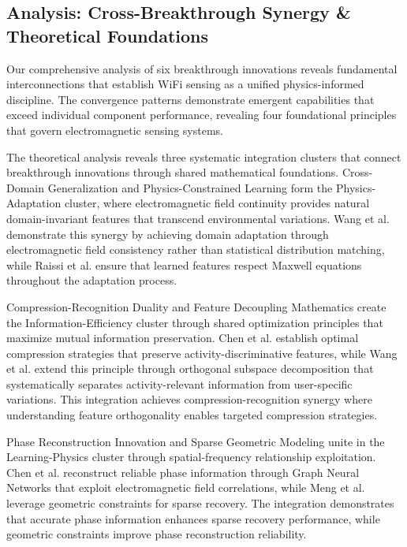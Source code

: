 \documentclass[journal]{IEEEtran}
\begin{document}
\subsection{Analysis: Cross-Breakthrough Synergy \& Theoretical Foundations}

Our comprehensive analysis of six breakthrough innovations reveals fundamental interconnections that establish WiFi sensing as a unified physics-informed discipline. The convergence patterns demonstrate emergent capabilities that exceed individual component performance, revealing four foundational principles that govern electromagnetic sensing systems.

The theoretical analysis reveals three systematic integration clusters that connect breakthrough innovations through shared mathematical foundations. Cross-Domain Generalization and Physics-Constrained Learning form the Physics-Adaptation cluster, where electromagnetic field continuity provides natural domain-invariant features that transcend environmental variations. Wang et al. \cite{wang2022airfi} demonstrate this synergy by achieving domain adaptation through electromagnetic field consistency rather than statistical distribution matching, while Raissi et al. \cite{raissi2019physics} ensure that learned features respect Maxwell equations throughout the adaptation process.

Compression-Recognition Duality and Feature Decoupling Mathematics create the Information-Efficiency cluster through shared optimization principles that maximize mutual information preservation. Chen et al. \cite{chen2024efficientfi} establish optimal compression strategies that preserve activity-discriminative features, while Wang et al. \cite{wang2024feature} extend this principle through orthogonal subspace decomposition that systematically separates activity-relevant information from user-specific variations. This integration achieves compression-recognition synergy where understanding feature orthogonality enables targeted compression strategies.

Phase Reconstruction Innovation and Sparse Geometric Modeling unite in the Learning-Physics cluster through spatial-frequency relationship exploitation. Chen et al. \cite{chen2024wiphase} reconstruct reliable phase information through Graph Neural Networks that exploit electromagnetic field correlations, while Meng et al. \cite{meng2021wihgr} leverage geometric constraints for sparse recovery. The integration demonstrates that accurate phase information enhances sparse recovery performance, while geometric constraints improve phase reconstruction reliability.
\end{document}
